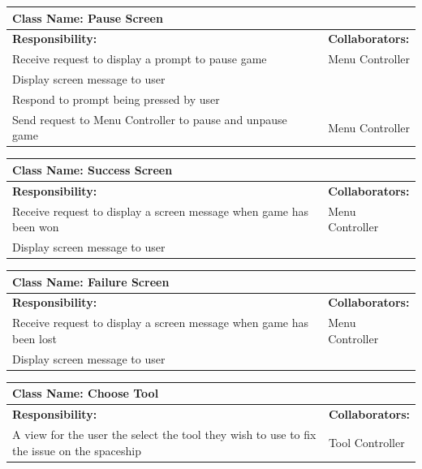 \documentclass[12pt, titlepage]{article}
\begin{document}
\begin{enumerate}[a)]
	\begin{table}[H]
		\centering
		\begin{tabular}{|p{5cm}|p{5cm}|}
		\hline 
		 \multicolumn{2}{|l|}{\textbf{Class Name: Pause Screen}} \\
		\hline
		\textbf{Responsibility:} & \textbf{Collaborators:} \\
		\hline
		 Receive request to display a prompt to pause game& Menu Controller \\
		\hline
		 Display screen message to user& \\
		\hline
		 Respond to prompt being pressed by user& \\
		\hline
		 Send request to Menu Controller to pause and unpause game& Menu Controller \\
		\hline
		\end{tabular}
	\end{table}
	
	\begin{table}[H]
		\centering
		\begin{tabular}{|p{5cm}|p{5cm}|}
		\hline 
		 \multicolumn{2}{|l|}{\textbf{Class Name: Success Screen}} \\
		\hline
		\textbf{Responsibility:} & \textbf{Collaborators:} \\
		\hline
		 Receive request to display a screen message when game has been won& Menu Controller \\
		\hline
		 Display screen message to user& \\
		\hline
		\end{tabular}
	\end{table}
	
	\begin{table}[H]
		\centering
		\begin{tabular}{|p{5cm}|p{5cm}|}
		\hline 
		 \multicolumn{2}{|l|}{\textbf{Class Name: Failure Screen}} \\
		\hline
		\textbf{Responsibility:} & \textbf{Collaborators:} \\
		\hline
		 Receive request to display a screen message when game has been lost& Menu Controller \\
		\hline
		 Display screen message to user& \\
		\hline
		\end{tabular}
	\end{table}	

	\begin{table}[H]
		\centering
		\begin{tabular}{|p{5cm}|p{5cm}|}
		\hline 
		 \multicolumn{2}{|l|}{\textbf{Class Name: Choose Tool}} \\
		\hline
		\textbf{Responsibility:} & \textbf{Collaborators:} \\
		\hline
		 A view for the user the select the tool they wish to use to fix the issue on the spaceship & Tool Controller\\
		\hline
		\end{tabular}
	\end{table}
	

\end{enumerate}
\end{document}
